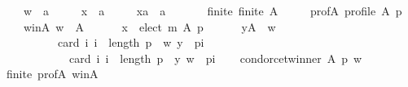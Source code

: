 \begin{isabellebody}
\ \ \ \ w\ {\isacharcolon}{\kern0pt}{\isacharcolon}{\kern0pt}\ {\isachardoublequoteopen}{\isacharprime}{\kern0pt}a{\isachardoublequoteclose}\ \isanewline
\ \ \ \ x\ {\isacharcolon}{\kern0pt}{\isacharcolon}{\kern0pt}\ {\isachardoublequoteopen}{\isacharprime}{\kern0pt}a{\isachardoublequoteclose}\ \isanewline
\ \ \ \ xa\ {\isacharcolon}{\kern0pt}{\isacharcolon}{\kern0pt}\ {\isachardoublequoteopen}{\isacharprime}{\kern0pt}a{\isachardoublequoteclose}\isanewline
\ \ \isamarkupfalse%
\isanewline
\ \ \ \ finite{\isacharcolon}{\kern0pt}\ {\isachardoublequoteopen}finite\ A{\isachardoublequoteclose}\ \isanewline
\ \ \ \ prof{\isacharunderscore}{\kern0pt}A{\isacharcolon}{\kern0pt}\ {\isachardoublequoteopen}profile\ A\ p{\isachardoublequoteclose}\ \isanewline
\ \ \ \ w{\isacharunderscore}{\kern0pt}in{\isacharunderscore}{\kern0pt}A{\isacharcolon}{\kern0pt}\ {\isachardoublequoteopen}w\ {\isasymin}\ A{\isachardoublequoteclose}\ \isanewline
\ \ \ \ {}{\isacharcolon}{\kern0pt}\ {\isachardoublequoteopen}x\ {\isasymin}\ elect\ m\ A\ p{\isachardoublequoteclose}\ \isanewline
\ \ \ \ {}{\isacharcolon}{\kern0pt}\ {\isachardoublequoteopen}{\isasymforall}y{\isasymin}A\ {\isacharminus}{\kern0pt}\ {\isacharbraceleft}{\kern0pt}w{\isacharbraceright}{\kern0pt}{\isachardot}{\kern0pt}\isanewline
\ \ \ \ \ \ \ \ \ \ card\ {\isacharbraceleft}{\kern0pt}i{\isachardot}{\kern0pt}\ i\ {\isacharless}{\kern0pt}\ length\ p\ {\isasymand}\ {\isacharparenleft}{\kern0pt}w{\isacharcomma}{\kern0pt}\ y{\isacharparenright}{\kern0pt}\ {\isasymin}\ {\isacharparenleft}{\kern0pt}p{\isacharbang}{\kern0pt}i{\isacharparenright}{\kern0pt}{\isacharbraceright}{\kern0pt}\ {\isacharless}{\kern0pt}\isanewline
\ \ \ \ \ \ \ \ \ \ \ \ card\ {\isacharbraceleft}{\kern0pt}i{\isachardot}{\kern0pt}\ i\ {\isacharless}{\kern0pt}\ length\ p\ {\isasymand}\ {\isacharparenleft}{\kern0pt}y{\isacharcomma}{\kern0pt}\ w{\isacharparenright}{\kern0pt}\ {\isasymin}\ {\isacharparenleft}{\kern0pt}p{\isacharbang}{\kern0pt}i{\isacharparenright}{\kern0pt}{\isacharbraceright}{\kern0pt}{\isachardoublequoteclose}\isanewline
\ \ \isamarkupfalse%
\ {\isachardoublequoteopen}condorcet{\isacharunderscore}{\kern0pt}winner\ A\ p\ w{\isachardoublequoteclose}\isanewline
\ \ \ \ \isamarkupfalse%
\ finite\ prof{\isacharunderscore}{\kern0pt}A\ w{\isacharunderscore}{\kern0pt}in{\isacharunderscore}{\kern0pt}A\ {\isachardoublequoteopen}{}{\isachardoublequoteclose}\isanewline
\ \ \ \ \isamarkupfalse%

\end{isabellebody}
